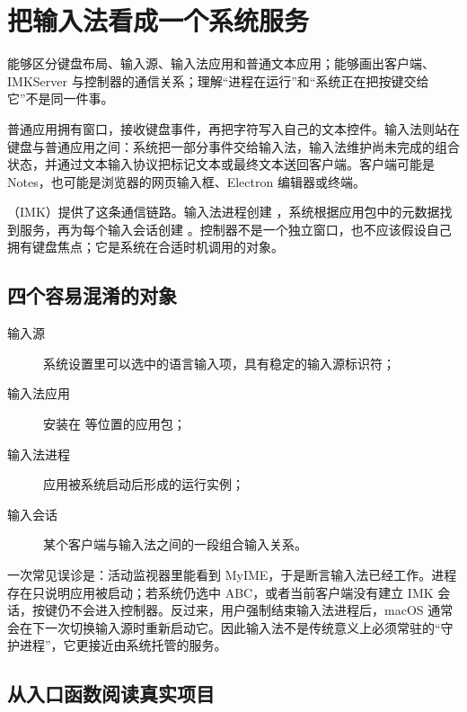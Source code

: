 \chapter{把输入法看成一个系统服务}

\begin{goals}
能够区分键盘布局、输入源、输入法应用和普通文本应用；能够画出客户端、IMKServer 与控制器的通信关系；理解“进程在运行”和“系统正在把按键交给它”不是同一件事。
\end{goals}

普通应用拥有窗口，接收键盘事件，再把字符写入自己的文本控件。输入法则站在键盘与普通应用之间：系统把一部分事件交给输入法，输入法维护尚未完成的组合状态，并通过文本输入协议把标记文本或最终文本送回客户端。客户端可能是 Notes，也可能是浏览器的网页输入框、Electron 编辑器或终端。

（IMK）提供了这条通信链路。输入法进程创建 ，系统根据应用包中的元数据找到服务，再为每个输入会话创建 。控制器不是一个独立窗口，也不应该假设自己拥有键盘焦点；它是系统在合适时机调用的对象。


\section{四个容易混淆的对象}

\begin{description}
  \item[输入源] 系统设置里可以选中的语言输入项，具有稳定的输入源标识符；
  \item[输入法应用] 安装在  等位置的应用包；
  \item[输入法进程] 应用被系统启动后形成的运行实例；
  \item[输入会话] 某个客户端与输入法之间的一段组合输入关系。
\end{description}

一次常见误诊是：活动监视器里能看到 MyIME，于是断言输入法已经工作。进程存在只说明应用被启动；若系统仍选中 ABC，或者当前客户端没有建立 IMK 会话，按键仍不会进入控制器。反过来，用户强制结束输入法进程后，macOS 通常会在下一次切换输入源时重新启动它。因此输入法不是传统意义上必须常驻的“守护进程”，它更接近由系统托管的服务。

\section{从入口函数阅读真实项目}


